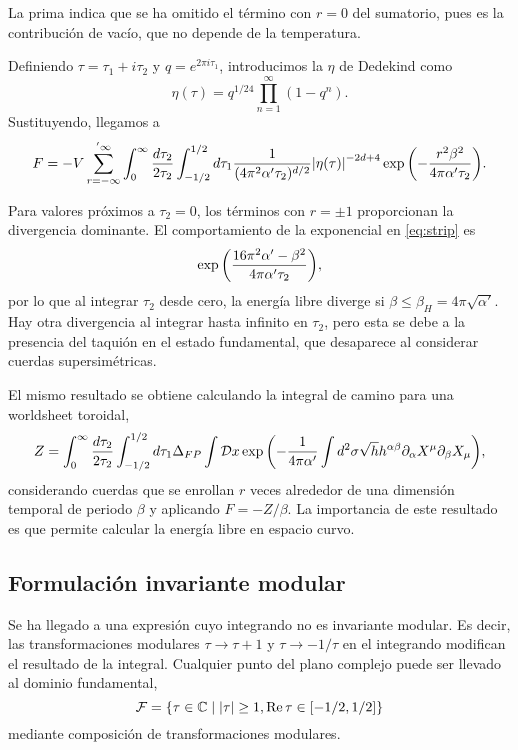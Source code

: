 La prima indica que se ha omitido el término con $r=0$ del sumatorio, pues es la contribución
de vacío, que no depende de la temperatura.

Definiendo $\tau=\tau_1+i\tau_2$ y $q=e^{2\pi i\tau_1}$, introducimos la $\eta$ de 
Dedekind como
\begin{equation}
  \eta(\tau)=q^{1/24}\prod_{n=1}^{\infty} (1-q^n).
\end{equation}
Sustituyendo, llegamos a 
\begin{equation}
  F=-V \sum_{r=-\infty}^{'\infty} \int_0^\infty\frac{d\tau_2}{2\tau_2} \int_{-1/2}^{1/2} d\tau_1  \frac{1}{(4\pi^2\alpha'\tau_2)^{d/2}}
  \abs{\eta(\tau)}^{-2d+4}\exp\qty(-\frac{r^2\beta^2}{4\pi\alpha'\tau_2}).
  \label{eq:strip}
\end{equation}

Para valores próximos a $\tau_2=0$, los términos con $r=\pm 1$ proporcionan la divergencia 
dominante.
El comportamiento de la exponencial en \ref{eq:strip} es
\begin{equation}
  \exp\qty(\frac{16\pi^2 \alpha' -\beta^2}{4\pi\alpha'\tau_2}),
\end{equation}
por lo que al integrar $\tau_2$ desde cero, la energía libre diverge si $\beta\leq \beta_H=4\pi\sqrt{\alpha'}$.
Hay otra divergencia al integrar hasta infinito en $\tau_2$, pero esta se debe a la presencia 
del taquión en el estado fundamental, que desaparece al considerar cuerdas supersimétricas.

El mismo resultado se obtiene calculando la integral de camino para una worldsheet toroidal,
\begin{equation}
  Z= \int_0^\infty\frac{d\tau_2}{2\tau_2} \int_{-1/2}^{1/2} d\tau_1 \Delta_{FP} \int \mathcal Dx
  \exp\qty(-\frac{1}{4\pi\alpha'}\int d^2\sigma \sqrt h h^{\alpha\beta}\partial_\alpha X^\mu \partial_\beta X_\mu),
\end{equation}
considerando cuerdas que se enrollan $r$ veces alrededor de una dimensión temporal de periodo $\beta$
y aplicando $F=-Z/\beta$.
La importancia de este resultado es que permite calcular la energía libre en espacio curvo.

\subsection{Formulación invariante modular}
\label{sec:taq}

Se ha llegado a una expresión cuyo integrando no es invariante modular. Es decir, las
transformaciones modulares $\tau\to\tau+1$ y $\tau\to-1/\tau$ en el integrando modifican el resultado
de la integral.
Cualquier punto del plano complejo puede ser llevado al dominio fundamental,
\begin{equation}
  \mathcal F = \qty{ \tau \in \mathbb{C} \mid \abs{\tau} \geq 1, \Re\tau \in [-1/2,1/2]}
\end{equation}
mediante composición de transformaciones modulares.

